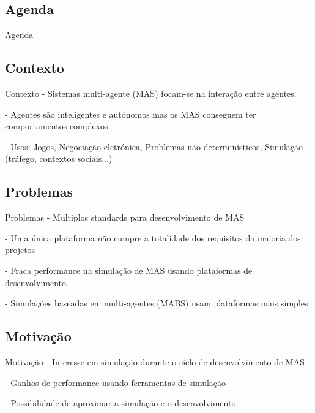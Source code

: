 
\subsection{Agenda}
\begin{frame}{Agenda}
	\setcounter{tocdepth}{1}
	\tableofcontents
\end{frame}

\subsection{Contexto}
\begin{frame}{Contexto}
- Sistemas multi-agente (MAS) focam-se na interação entre agentes.

- Agentes são inteligentes e autónomos mas os MAS conseguem ter comportamentos complexos.

- Usos: Jogos, Negociação eletrónica, Problemas não determinísticos, Simulação (tráfego, contextos sociais...)
\end{frame}

\subsection{Problemas}
\begin{frame}{Problemas}
- Multiplos standards para desenvolvimento de MAS

- Uma única plataforma não cumpre a totalidade dos requisitos da maioria dos projetos

- Fraca performance na simulação de MAS usando plataformas de desenvolvimento.

- Simulações baseadas em multi-agentes (MABS) usam plataformas mais simples.

\end{frame}

\subsection{Motivação}
\begin{frame}{Motivação}
- Interesse em simulação durante o ciclo de desenvolvimento de MAS

- Ganhos de performance usando ferramentas de simulação

- Possibilidade de aproximar a simulação e o desenvolvimento
\end{frame}

